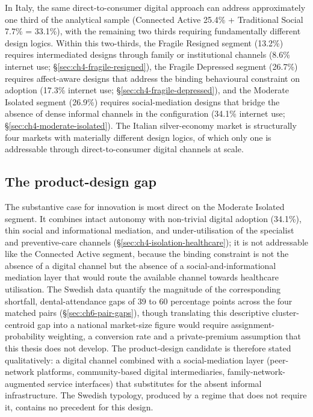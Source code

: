 In Italy, the same direct-to-consumer digital approach can address approximately one third of the analytical sample (Connected Active 25.4\% + Traditional Social 7.7\% = 33.1\%), with the remaining two thirds requiring fundamentally different design logics. Within this two-thirds, the Fragile Resigned segment (13.2\%) requires intermediated designs through family or institutional channels (8.6\% internet use; \S\ref{sec:ch4-fragile-resigned}), the Fragile Depressed segment (26.7\%) requires affect-aware designs that address the binding behavioural constraint on adoption (17.3\% internet use; \S\ref{sec:ch4-fragile-depressed}), and the Moderate Isolated segment (26.9\%) requires social-mediation designs that bridge the absence of dense informal channels in the configuration (34.1\% internet use; \S\ref{sec:ch4-moderate-isolated}). The Italian silver-economy market is structurally four markets with materially different design logics, of which only one is addressable through direct-to-consumer digital channels at scale.

\subsection{The product-design gap}
\label{sec:ch6-product-design-gap}

The substantive case for innovation is most direct on the Moderate Isolated segment. It combines intact autonomy with non-trivial digital adoption (34.1\%), thin social and informational mediation, and under-utilisation of the specialist and preventive-care channels (\S\ref{sec:ch4-isolation-healthcare}); it is not addressable like the Connected Active segment, because the binding constraint is not the absence of a digital channel but the absence of a social-and-informational mediation layer that would route the available channel towards healthcare utilisation. The Swedish data quantify the magnitude of the corresponding shortfall, dental-attendance gaps of 39 to 60 percentage points across the four matched pairs (\S\ref{sec:ch6-pair-gaps}), though translating this descriptive cluster-centroid gap into a national market-size figure would require assignment-probability weighting, a conversion rate and a private-premium assumption that this thesis does not develop. The product-design candidate is therefore stated qualitatively: a digital channel combined with a social-mediation layer (peer-network platforms, community-based digital intermediaries, family-network-augmented service interfaces) that substitutes for the absent informal infrastructure. The Swedish typology, produced by a regime that does not require it, contains no precedent for this design.

